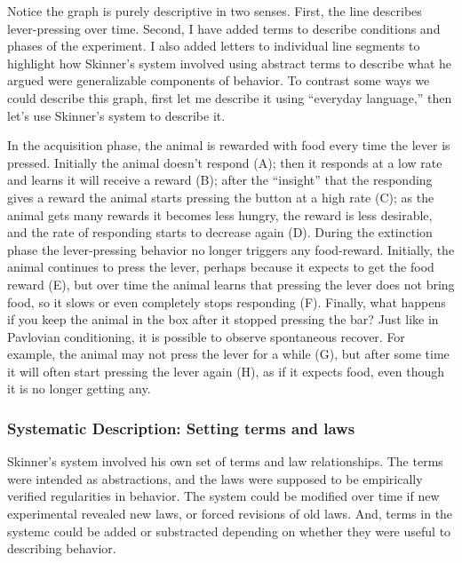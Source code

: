 \documentclass[
  oneside,
  12pt]{crumpbook}
\begin{document}
Notice the graph is purely descriptive in two senses. First, the line describes lever-pressing over time. Second, I have added terms to describe conditions and phases of the experiment. I also added letters to individual line segments to highlight how Skinner's system involved using abstract terms to describe what he argued were generalizable components of behavior. To contrast some ways we could describe this graph, first let me describe it using ``everyday language,'' then let's use Skinner's system to describe it.

In the acquisition phase, the animal is rewarded with food every time the lever is pressed. Initially the animal doesn't respond (A); then it responds at a low rate and learns it will receive a reward (B); after the ``insight'' that the responding gives a reward the animal starts pressing the button at a high rate (C); as the animal gets many rewards it becomes less hungry, the reward is less desirable, and the rate of responding starts to decrease again (D). During the extinction phase the lever-pressing behavior no longer triggers any food-reward. Initially, the animal continues to press the lever, perhaps because it expects to get the food reward (E), but over time the animal learns that pressing the lever does not bring food, so it slows or even completely stops responding (F). Finally, what happens if you keep the animal in the box after it stopped pressing the bar? Just like in Pavlovian conditioning, it is possible to observe spontaneous recover. For example, the animal may not press the lever for a while (G), but after some time it will often start pressing the lever again (H), as if it expects food, even though it is no longer getting any.

\hypertarget{systematic-description-setting-terms-and-laws}{%
\subsubsection{Systematic Description: Setting terms and laws}\label{systematic-description-setting-terms-and-laws}}

Skinner's system involved his own set of terms and law relationships. The terms were intended as abstractions, and the laws were supposed to be empirically verified regularities in behavior. The system could be modified over time if new experimental revealed new laws, or forced revisions of old laws. And, terms in the systemc could be added or substracted depending on whether they were useful to describing behavior.
\end{document}

